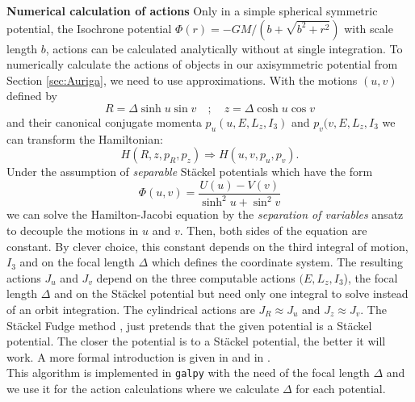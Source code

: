 \textbf{Numerical calculation of actions} Only in a simple spherical symmetric potential, the Isochrone potential $\Phi(r) = -GM/(b + \sqrt{b^2+r^2})$ with scale length $b$, actions can be calculated analytically without at single integration. To numerically calculate the actions of objects in our axisymmetric potential from Section \ref{sec:Auriga}, we need to use approximations. 
With the motions $(u,v)$ defined by 
\begin{equation}
    R = \Delta \sinh{u} \sin{v}\quad ; \quad z = \Delta \cosh{u}\cos{v}
\end{equation}
and their canonical conjugate momenta $p_u(u, E, L_z, I_3)$ and $p_v(v,E,L_z,I_3$ we can transform the Hamiltonian:
\begin{equation}\label{eq:Ham_trafo}
    H(R,z,p_R,p_z) \Rightarrow H(u,v,p_u, p_v).
\end{equation}
Under the assumption of \textit{separable} St\"ackel potentials \citep{deZeeuw...Staeckel..1985} which have the form
\begin{equation}\label{eq:Stackel_pot}
    \Phi(u,v) = \frac{U(u)-V(v)}{\sinh^2u + \sin^2v}
\end{equation}
we can solve the Hamilton-Jacobi equation by the \textit{separation of variables} ansatz to decouple the motions in $u$ and $v$. Then, both sides of the equation are constant. By clever choice, this constant depends on the third integral of motion, $I_3$ and on the focal length $\Delta$ which defines the coordinate system. The resulting actions $J_u$ and $J_v$ depend on the three computable actions $(E, L_z, I_3$), the focal length $\Delta$ and on the St\"ackel potential but need only one integral to solve instead of an orbit integration. The cylindrical actions are $J_R \approx J_u$ and $J_z \approx J_v$. The St\"ackel Fudge method \citep{Binney...StaeckelFudge...2012, Bovy...actionbasedmodelling...2013}, just pretends that the given potential is a St\"ackel potential. The closer the potential is to a St\"ackel potential, the better it will work. A more formal introduction is given in \citet{Binney...Tremaine...2008, Binney...StaeckelFudge...2012, Bovy...actionbasedmodelling...2013} and in \citet{Wilmathesis}. 
\\This algorithm is implemented in \texttt{galpy} with the need of the focal length $\Delta$ and we use it for the action calculations where we calculate $\Delta$ for each potential. 

